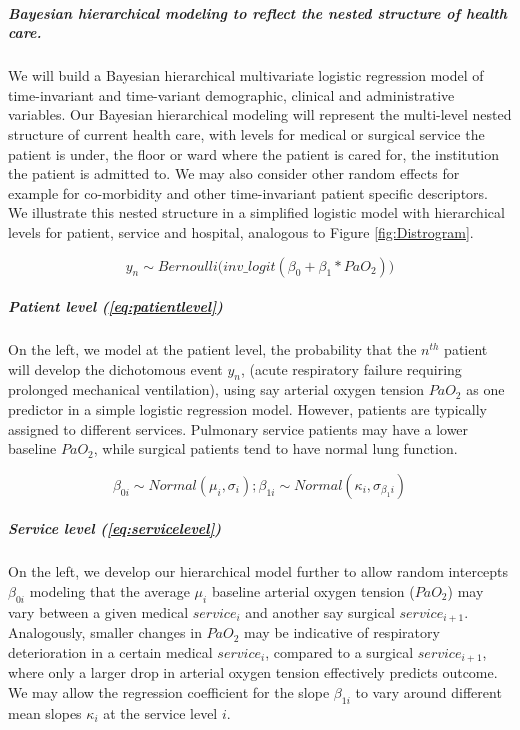 \documentclass[11pt,notitlepage]{article}
\begin{document}
\subparagraph*{Bayesian hierarchical modeling to reflect the nested structure of health care.}   
We will build a Bayesian hierarchical multivariate logistic regression model of time-invariant and time-variant demographic, clinical and administrative variables. Our Bayesian hierarchical modeling will represent the multi-level nested structure of current health care, with levels for medical or surgical service the patient is under, the floor or ward where the patient is cared for, the institution the patient is admitted to. We may also consider other random effects for example for co-morbidity and other time-invariant patient specific descriptors. We illustrate this nested structure in a simplified logistic model with hierarchical levels for patient, service and hospital, analogous to Figure \ref{fig:Distrogram}. 

\begin{figure}
\vspace{-5pt}
 \begin{equation} \label{eq:patientlevel}
 y_{n} \sim Bernoulli \Big(inv\_logit (\beta_{0} +\beta_{1} * PaO_2) \Big)
 \end{equation}
\vspace{-25pt}
\end{figure}

\subparagraph*{Patient level (\ref{eq:patientlevel})}
On the left, we model at the patient level, the probability that the $n^{th}$ patient will develop the dichotomous event $y_n$, (acute respiratory failure requiring prolonged mechanical ventilation), using say arterial oxygen tension $PaO_{2}$ as one predictor in a simple logistic regression model. However, patients are typically assigned to different services. Pulmonary service patients may have a lower baseline $PaO_2$, while surgical patients tend to have normal lung function. 

\begin{figure}
\vspace{-10pt}
\begin{equation} \label{eq:servicelevel}
 \beta_{0i} \sim Normal (\mu_i , \sigma_{i}); \beta_{1i} \sim Normal (\kappa_i, \sigma_{\beta_1i})
\end{equation}
\vspace{-25pt}
\end{figure}

\subparagraph*{Service level (\ref{eq:servicelevel})}
On the left, we develop our hierarchical model further to allow random intercepts $\beta_{0i}$ modeling that the average  $\mu_i$ baseline arterial oxygen tension ($PaO_2$) may vary between a given medical $service_i$ and another say surgical $service_{i+1}$. Analogously, smaller changes in $PaO_2$ may be indicative of respiratory deterioration in a certain medical $service_i$, compared to a surgical $service_{i+1}$, where only a larger drop in arterial oxygen tension effectively predicts outcome. We may allow the regression coefficient for the slope $\beta_{1i}$ to vary around different mean slopes $\kappa_i$ at the service level $i$. 
\end{document}
